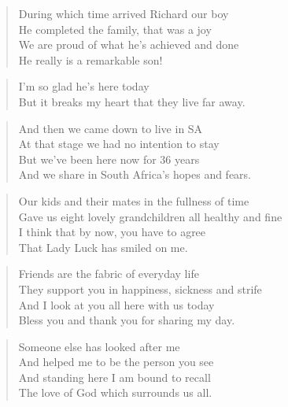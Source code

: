 \begin{verse}
During which time arrived Richard our boy \\
He completed the family, that was a joy \\
We are proud of what he's achieved and done \\
He really is a remarkable son! \\
\end{verse}

\begin{verse}
I'm so glad he's here today \\
But it breaks my heart that they live far away. \\
\end{verse}

\begin{verse}
And then we came down to live in SA \\
At that stage we had no intention to stay \\
But we've been here now for 36 years \\
And we share in South Africa's hopes and fears. \\
\end{verse}

\begin{verse}
Our kids and their mates in the fullness of time \\
Gave us eight lovely grandchildren all healthy and fine \\
I think that by now, you have to agree \\
That Lady Luck has smiled on me. \\
\end{verse}

\begin{verse}
Friends are the fabric of everyday life \\
They support you in happiness, sickness and strife \\
And I look at you all here with us today \\
Bless you and thank you for sharing my day. \\
\end{verse}

\begin{verse}
Someone else has looked after me \\
And helped me to be the person you see \\
And standing here I am bound to recall \\
The love of God which surrounds us all. \\
\end{verse}
